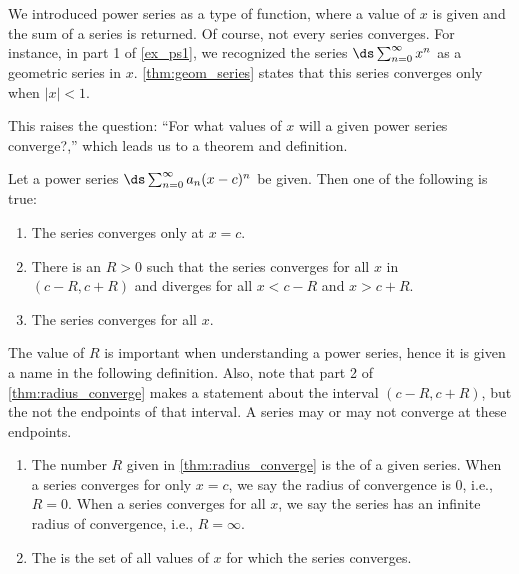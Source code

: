 We introduced power series as a type of function, where a value of $x$ is given and the sum of a series is returned. Of course, not every series converges. For instance, in part 1 of \autoref{ex_ps1}, we recognized the series $\ds \sum_{n=0}^\infty x^n$ as a geometric series in $x$. \autoref{thm:geom_series} states that this series converges only when $|x|<1$. 

This raises the question: ``For what values of $x$ will a given power series converge?,'' which  leads us to a theorem and definition.

{Let a power series $\ds \sum_{n=0}^\infty a_n(x-c)^n$ be given. Then one of the following is true:
\begin{enumerate}
	\item The series converges only at $x=c$.
	\item	There is an $R>0$ such that the series converges for all $x$ in \\	
	$(c-R,c+R)$ and diverges for all $x<c-R$ and $x>c+R$.
	\item	The series converges for all $x$.
\end{enumerate}
}

	
The value of $R$ is important when understanding a power series, hence it is given a name in the following definition. Also, note that part 2 of \autoref{thm:radius_converge} makes a statement about the interval $(c-R,c+R)$, but the not the endpoints of that interval. A series may or may not converge at these endpoints.
	
{ \begin{enumerate}
	\item The number $R$ given in \autoref{thm:radius_converge} is the  of a given series. When a series converges for only $x=c$, we say the radius of convergence is 0, i.e.,  $R=0$. When a series converges for all $x$, we say the series has an infinite radius of convergence, i.e., $R=\infty$.
	\item	The  is the set of all values of $x$ for which the series converges.
\end{enumerate}}

